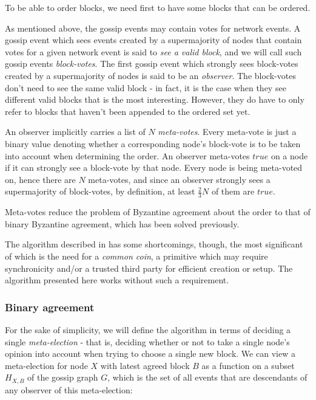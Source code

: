 \documentclass[a4paper,fleqn]{article}
\begin{document}
To be able to order blocks, we need first to have some blocks that can be ordered.

As mentioned above, the gossip events may contain votes for network events. A gossip event which
sees events created by a supermajority of nodes that contain votes for a given network event is
said to \emph{see a valid block}, and we will call such gossip events \emph{block-votes}. The first
gossip event which strongly sees block-votes created by a supermajority of nodes is said to be an
\emph{observer}. The block-votes don't need to see the same valid block - in fact, it is the case
when they see different valid blocks that is the most interesting. However, they do have to only
refer to blocks that haven't been appended to the ordered set yet.

An observer implicitly carries a list of $N$ \emph{meta-votes}. Every meta-vote is just a binary
value denoting whether a corresponding node's block-vote is to be taken into account when
determining the order. An observer meta-votes $true$ on a node if it can strongly see a block-vote
by that node. Every node is being meta-voted on, hence there are $N$ meta-votes, and since an
observer strongly sees a supermajority of block-votes, by definition, at least $\frac{2}{3}N$ of
them are $true$.

Meta-votes reduce the problem of Byzantine agreement about the order to that of binary Byzantine
agreement, which has been solved previously\cite{aba}.

The algorithm described in \cite{aba} has some shortcomings, though, the most significant of which
is the need for a \emph{common coin}, a primitive which may require synchronicity and/or a trusted
third party for efficient creation or setup. The algorithm presented here works without such a
requirement.

\subsubsection{Binary agreement}

For the sake of simplicity, we will define the algorithm in terms of deciding a single
\emph{meta-election} - that is, deciding whether or not to take a single node's opinion into
account when trying to choose a single new block. We can view a meta-election for node $X$ with
latest agreed block $B$ as a function on a subset $H_{X,B}$ of the gossip graph $G$, which is the
set of all events that are descendants of any observer of this meta-election:
\end{document}
